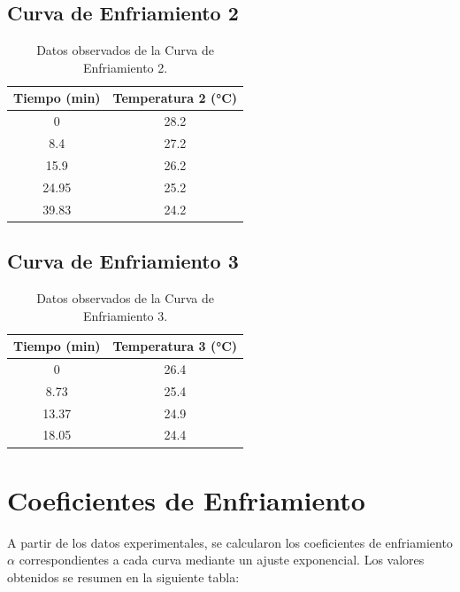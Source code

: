 \documentclass[article,12pt]{elsarticle}
\begin{document}
\subsection*{Curva de Enfriamiento 2}
\begin{table}[H]
\centering
\begin{tabular}{|c|c|}
\hline
\textbf{Tiempo (min)} & \textbf{Temperatura 2 (°C)} \\ \hline
0                     & 28.2                       \\ \hline
8.4                   & 27.2                       \\ \hline
15.9                  & 26.2                       \\ \hline
24.95                 & 25.2                       \\ \hline
39.83                 & 24.2                       \\ \hline
\end{tabular}
\caption{Datos observados de la Curva de Enfriamiento 2.}
\end{table}

\subsection*{Curva de Enfriamiento 3}
\begin{table}[H]
\centering
\begin{tabular}{|c|c|}
\hline
\textbf{Tiempo (min)} & \textbf{Temperatura 3 (°C)} \\ \hline
0                     & 26.4                       \\ \hline
8.73                  & 25.4                       \\ \hline
13.37                 & 24.9                       \\ \hline
18.05                 & 24.4                       \\ \hline
\end{tabular}
\caption{Datos observados de la Curva de Enfriamiento 3.}
\end{table}

\section*{Coeficientes de Enfriamiento}

A partir de los datos experimentales, se calcularon los coeficientes de enfriamiento \(\alpha\) correspondientes a cada curva mediante un ajuste exponencial. Los valores obtenidos se resumen en la siguiente tabla:
\end{document}
